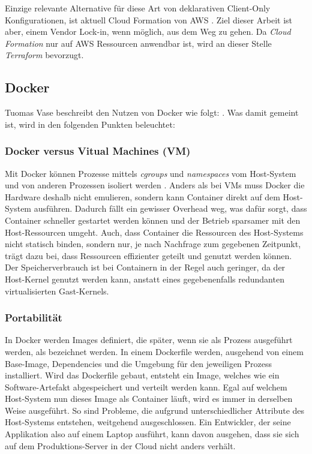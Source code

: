 Einzige relevante Alternative für diese Art von
deklarativen Client-Only Konfigurationen,
ist aktuell Cloud Formation von AWS \cite{terravs}.
Ziel dieser Arbeit ist aber, einem Vendor Lock-in, wenn möglich, aus dem Weg zu gehen.
Da \emph{Cloud Formation} nur auf AWS Ressourcen anwendbar ist, wird an
dieser
Stelle \emph{Terraform} bevorzugt.

\subsection{Docker}

Tuomas Vase beschreibt den Nutzen von Docker wie folgt:
 \cite{vase2015advantages}.
Was damit gemeint ist, wird in den folgenden Punkten beleuchtet:

\subsubsection{Docker versus Vitual Machines (VM)}
Mit Docker \cite{docker} können Prozesse mittels \emph{cgroups} und \emph{namespaces} vom
Host-System und von anderen
Prozessen isoliert werden \cite{DockerInAction}. Anders als bei VMs muss Docker
die
Hardware deshalb nicht emulieren, sondern kann Container direkt auf dem
Host-System
ausführen. Dadurch fällt ein gewisser Overhead weg, was dafür sorgt,
dass Container schneller gestartet werden können und der Betrieb sparsamer
mit den Host-Ressourcen umgeht. Auch, dass Container die Ressourcen des
Host-Systems
nicht statisch binden, sondern nur, je nach Nachfrage zum gegebenen Zeitpunkt,
trägt dazu bei, dass Ressourcen effizienter geteilt und genutzt werden können.
Der Speicherverbrauch ist bei Containern in der Regel auch geringer, da der
Host-Kernel
genutzt werden kann, anstatt eines gegebenenfalls redundanten virtualisierten
Gast-Kernels.

\subsubsection{Portabilität}
In Docker werden Images definiert, die später, wenn sie als Prozess ausgeführt
werden,
als  bezeichnet werden. In einem Dockerfile werden, ausgehend von
einem Base-Image,
Dependencies und die Umgebung für den jeweiligen Prozess installiert.
Wird das
Dockerfile gebaut, entsteht ein Image, welches wie ein Software-Artefakt
abgespeichert und verteilt werden kann.
Egal auf welchem Host-System nun dieses Image als Container läuft,
wird es immer in derselben Weise ausgeführt. So sind Probleme, die aufgrund
unterschiedlicher Attribute des Host-Systems entstehen, weitgehend ausgeschlossen.
Ein Entwickler, der seine Applikation also auf einem Laptop ausführt, kann davon
ausgehen, dass sie sich auf dem Produktions-Server in der Cloud nicht anders
verhält.

